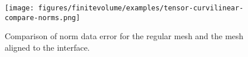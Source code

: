 \begin{figure}[ht]
\begin{center}
\texttt{[image: figures/finitevolume/examples/tensor-curvilinear-compare-norms.png]}
\end{center}
\caption{Comparison of norm data error for the regular mesh and the mesh aligned to the interface.}
\label{fig:fv-ex-tensor-curvilinear-compare-norms}
\end{figure}
